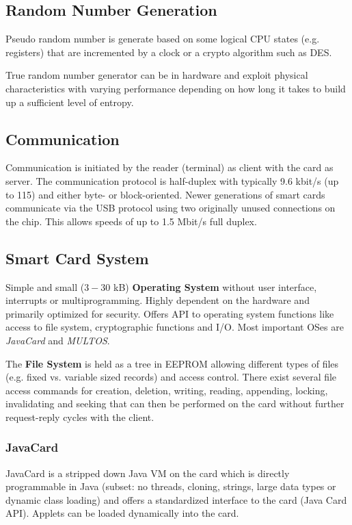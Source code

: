 \documentclass{article}
\begin{document}
\begin{multicols}{2}
\subsection{Random Number Generation}
Pseudo random number is generate based on some logical CPU states (e.g.
registers) that are incremented by a clock or a crypto algorithm such as DES.

True random number generator can be in hardware and exploit physical
characteristics with varying performance depending on how long it takes to build
up a sufficient level of entropy.

\subsection{Communication}
Communication is initiated by the reader (terminal) as client with the card as
server. The communication protocol is half-duplex with typically 9.6 kbit/s (up
to 115) and either byte- or block-oriented. Newer generations of smart cards
communicate via the USB protocol using two originally unused connections on the
chip. This allows speeds of up to 1.5 Mbit/s full duplex.


\subsection{Smart Card System}
Simple and small ($3-30$ kB) {\bf Operating System} without user interface,
interrupts or multiprogramming. Highly dependent on the hardware and primarily optimized
for security. Offers API to operating system functions like access to file
system, cryptographic functions and I/O. Most important OSes are {\it JavaCard}
and {\it MULTOS}.

The {\bf File System} is held as a tree in EEPROM allowing different types of
files (e.g. fixed vs. variable sized records) and access control. There exist
several file access commands for creation, deletion, writing, reading,
appending, locking, invalidating and seeking that can then be performed on the
card without further request-reply cycles with the client.

\subsubsection{JavaCard}
JavaCard is a stripped down Java VM on the card which is directly programmable
in Java (subset: no threads, cloning, strings, large data types or dynamic
class loading) and offers a standardized interface to the card (Java Card API).
Applets can be loaded dynamically into the card.


\end{multicols}
\end{document}
